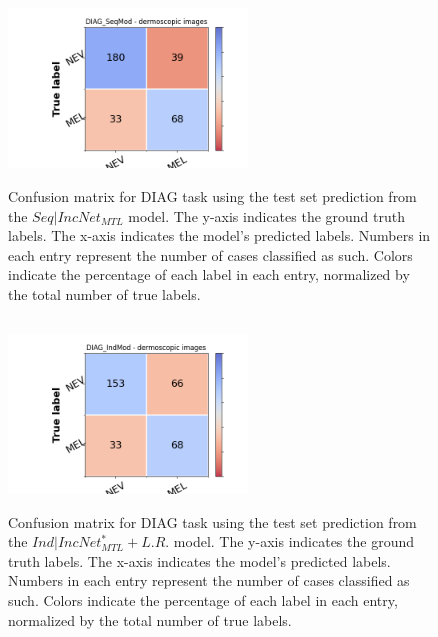 \subsection{\texorpdfstring{}{TEXT}}
\begin{figure}[ht]
\centering
{\includegraphics[width =2.5in]{images/appendice/mtl/DIAG_CM_SeqMod.png}}
\caption{Confusion matrix for DIAG task using the test set prediction
from the $Seq|IncNet_{MTL}$ model. The y-axis indicates the ground truth labels. The x-axis indicates the model’s predicted labels. Numbers in each entry represent
the number of cases classified as such. Colors indicate the percentage of each
label in each entry, normalized by the total number of true labels.}
\label{SeqincNetCM}
\end{figure}
\clearpage

\subsection{\texorpdfstring{}{TEXT}}
\begin{figure}[ht]
\centering
{\includegraphics[width =2.5in]{images/appendice/incnet+lr/DIAG_CM_IndMod.png}}
\caption{Confusion matrix for DIAG task using the test set prediction
from the $Ind|IncNet^*_{MTL}+L.R.$ model. The y-axis indicates the ground truth labels. The x-axis indicates the model’s predicted labels. Numbers in each entry represent
the number of cases classified as such. Colors indicate the percentage of each
label in each entry, normalized by the total number of true labels. }
\label{IndincNet+lrCM}
\end{figure}

